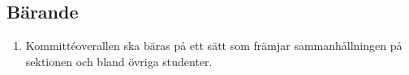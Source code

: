 \documentclass[11pt,a4paper]{article}
\begin{document}
\subsection{Bärande}

\begin{enumerate}[\thesubsection .1]

  \item Kommittéoverallen ska bäras på ett sätt som främjar
  samman\-håll\-ning\-en på sektionen och bland övriga studenter.

\end{enumerate}
\begin{comment}
\newpage

\appendix

\section{Förteckning över Dumvästinnehavare}

\label{dumvast}

Här följer samtliga dumvästinnehavare sedan denna förnämliga post
infördes. Att ingen ny och bättre dumhet hittats på nästa sektionsmöte
indikeras genom att antalet sektionsmöten återfinns inom parentes. Den
färskaste innehavaren återfinns överst.

\begin{longtable}{p{55mm}lp{60mm}}
  \emph{Namn} & \emph{Årskurs} & \emph{Dumhet}\\ \hline

Oskar ''Gurkan'' Sjökvist & f14 & Skrev ut ett labb-PM till expfysen i A0-format. 3 gånger. 

Johanna ''Nioreh'' Renman & f14& Hade sönder Tvåan och hamnade på Hvitfeldska med 11 flak öl under en föräldrakväll. \\\hline

Felix ''Felkan'' Eriksson & f13 & Trodde att pasta växer på träd. \\\hline

Per Ljung & f13 & Klagade över att han inte kunde få tag i någon studentlägenhet närmre Chalmers. Det uppdagades sedan att han på Boplats var registrerad som att han gick i grundskolan. När han väl fick en lägenhet sade han upp sin gamla innnan visningen, varpå han nästan missade att tacka ja till den nya.  \\\hline

Sofia ''Sol'' Toivonen & tm12 & Försökte förgäves rensa vasken på Focus med händerna, utan att inse att problemet var att proppen satt i. \\\hline


\end{comment}
\end{document}
